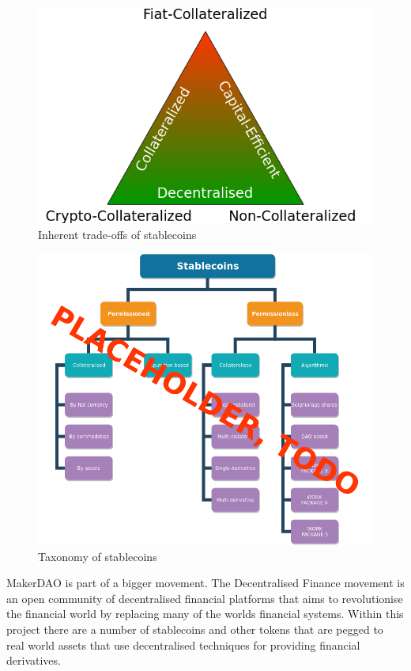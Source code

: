 \documentclass[english,]{IEEEtran}
\begin{document}
\begin{figure}[htbp]
\centering
\includegraphics{img/Triangle.png}
\caption{Inherent trade-offs of stablecoins \label{triangle_label}}
\end{figure}

\begin{figure}[htbp]
\centering
\includegraphics{img/intro.png}
\caption{Taxonomy of stablecoins \label{intro_label}}
\end{figure}

MakerDAO is part of a bigger movement. The Decentralised Finance
movement is an open community of decentralised financial platforms that
aims to revolutionise the financial world by replacing many of the
worlds financial systems. Within this project there are a number of
stablecoins and other tokens that are pegged to real world assets that
use decentralised techniques for providing financial derivatives.
\end{document}
